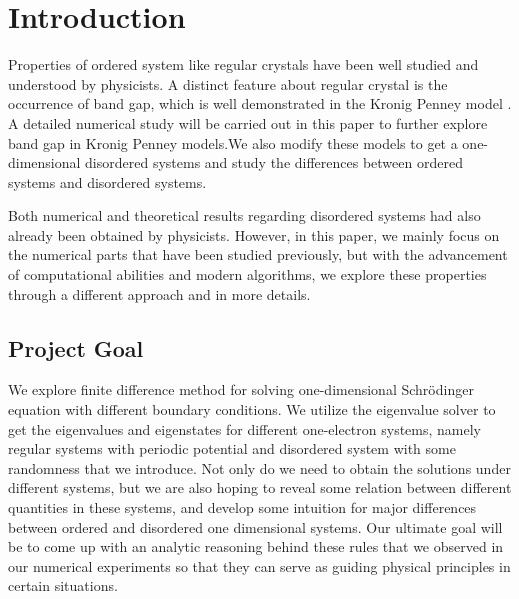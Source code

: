 \chapter{Introduction}\label{Ch:Introduction}

Properties of ordered system like regular crystals have been well studied and understood by physicists. A distinct feature about regular crystal is the occurrence of band gap, which is well demonstrated in the Kronig Penney model \cite{kronigPenneyModel}. A detailed numerical study will be carried out in this paper to further explore band gap in Kronig Penney models.We also modify these models to get a one-dimensional disordered systems and study the differences between ordered systems and disordered systems.


Both numerical and theoretical results regarding disordered systems had also already been obtained by physicists\cite{summerPaper}. However, in this paper, we mainly focus on the numerical parts that have been studied previously\cite{summerPaper}, but with the advancement of computational abilities and modern algorithms, we explore these properties through a different approach and in more details. 


\section{Project Goal}
We explore finite difference method \cite{finiteDifferenceMethod} for solving one-dimensional Schr\"{o}dinger equation with different boundary conditions. We utilize the eigenvalue solver to get the eigenvalues and eigenstates for different one-electron systems, namely regular systems with periodic potential and disordered system with some randomness that we introduce. Not only do we need to obtain the solutions under different systems, but we are also hoping to reveal some relation between different quantities in these systems, and develop some intuition for major differences between ordered and disordered one dimensional systems. Our ultimate goal will be to come up with an analytic reasoning behind these rules that we observed in our numerical experiments so that they can serve as guiding physical principles in certain situations. 



